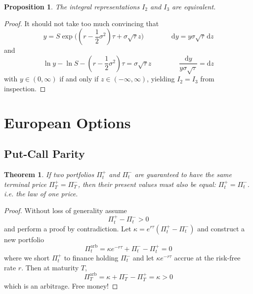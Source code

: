 \documentclass[12pt]{article}
\newtheorem{theorem}{Theorem}
\newtheorem{proposition}[lemma]{Proposition}
\theoremstyle{definition}
\theoremstyle{remark}
\begin{document}
\begin{proposition}
\label{prop: i2 i3}
	The integral representations $I_2$ and $I_3$ are equivalent.
\end{proposition}
\begin{proof}
	It should not take too much convincing that
	$$
	y = S \exp\big((r-\frac12\sigma^2)\tau + \sigma \sqrt{\tau} z \big)
	\qquad\qquad
	\mathrm{d}y = y \sigma \sqrt{\tau} \,\mathrm{d}z
	$$
	and
	$$
	\ln y - \ln S - (r-\frac12\sigma^2)\tau = \sigma \sqrt{\tau} z
	\qquad\qquad
	\frac{\mathrm{d}y}{y \sigma \sqrt{\tau}} = \mathrm{d}z
	$$
	with $y\in(0,\infty)$ if and only if $z\in(-\infty,\infty)$, yielding $I_2 = I_3$ from inspection.
\end{proof}



\section{European Options}


\subsection{Put-Call Parity}
\begin{theorem}
	If two portfolios $\Pi_t^+$ and $\Pi_t^-$ are guaranteed to have the same terminal price $\Pi_T^+=\Pi_T^-$, then their present values must also be equal: $\Pi_t^+=\Pi_t^-$. i.e. the law of one price.
\end{theorem}
\begin{proof}
	Without loss of generality assume
	$$
	\Pi_t^+ - \Pi_t^- > 0
	$$
	and perform a proof by contradiction. Let $\kappa = e^{r\tau}(\Pi_t^+ - \Pi_t^-)$ and construct a new portfolio
	$$
	\Pi_t^\mathrm{arb} = \kappa e^{-r\tau} + \Pi_t^- - \Pi_t^+ = 0
	$$
	where we short $\Pi_t^+$ to finance holding $\Pi_t^-$ and let $\kappa e^{-r\tau}$ accrue at the risk-free rate $r$. Then at maturity $T$,
	$$
	\Pi_T^\mathrm{arb} = \kappa + \Pi_T^- - \Pi_T^+ = \kappa > 0
	$$
	which is an arbitrage. Free money!
\end{proof}
\end{document}
